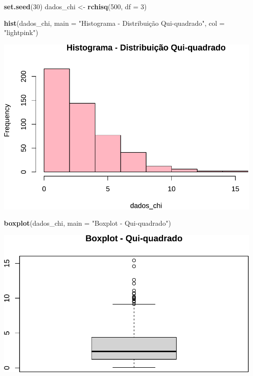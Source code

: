 \documentclass[
]{book}
\newenvironment{Shaded}{\begin{snugshade}}{\end{snugshade}}
\newcommand{\AttributeTok}[1]{\textcolor[rgb]{0.13,0.29,0.53}{#1}}
\newcommand{\DecValTok}[1]{\textcolor[rgb]{0.00,0.00,0.81}{#1}}
\newcommand{\FunctionTok}[1]{\textcolor[rgb]{0.13,0.29,0.53}{\textbf{#1}}}
\newcommand{\NormalTok}[1]{#1}
\newcommand{\OtherTok}[1]{\textcolor[rgb]{0.56,0.35,0.01}{#1}}
\newcommand{\StringTok}[1]{\textcolor[rgb]{0.31,0.60,0.02}{#1}}
\begin{document}
\begin{Shaded}
\begin{Highlighting}[]
\FunctionTok{set.seed}\NormalTok{(}\DecValTok{30}\NormalTok{)}
\NormalTok{dados\_chi }\OtherTok{\textless{}{-}} \FunctionTok{rchisq}\NormalTok{(}\DecValTok{500}\NormalTok{, }\AttributeTok{df =} \DecValTok{3}\NormalTok{)}

\FunctionTok{hist}\NormalTok{(dados\_chi, }\AttributeTok{main =} \StringTok{"Histograma {-} Distribuição Qui{-}quadrado"}\NormalTok{, }\AttributeTok{col =} \StringTok{"lightpink"}\NormalTok{)}
\end{Highlighting}
\end{Shaded}

\includegraphics{Livro-Estatistica+R_files/figure-latex/nnormal-1.pdf}

\begin{Shaded}
\begin{Highlighting}[]
\FunctionTok{boxplot}\NormalTok{(dados\_chi, }\AttributeTok{main =} \StringTok{"Boxplot {-} Qui{-}quadrado"}\NormalTok{)}
\end{Highlighting}
\end{Shaded}

\includegraphics{Livro-Estatistica+R_files/figure-latex/nnormal-2.pdf}
\end{document}
